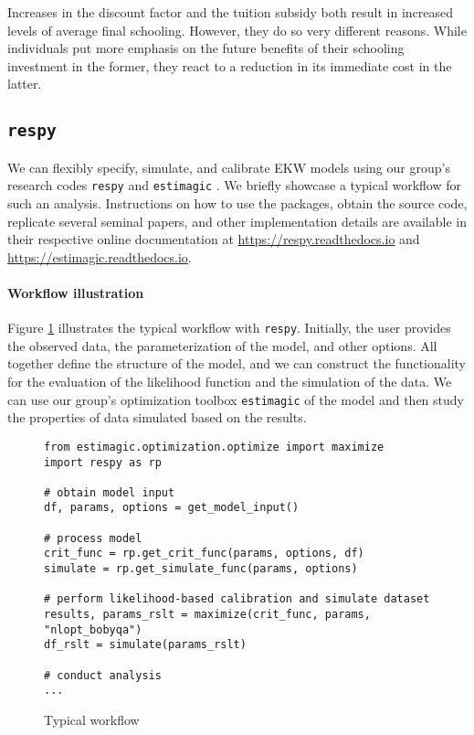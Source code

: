 \noindent Increases in the discount factor and the tuition subsidy both result in increased levels of average final schooling. However, they do so very different reasons. While individuals put more emphasis on the future benefits of their schooling investment in the former, they react to a reduction in its immediate cost in the latter.
\subsection{\texttt{respy}}
We can flexibly specify, simulate, and calibrate EKW models using our group's research codes \verb+respy+ \citep{respy-1.0} and \verb+estimagic+  \citep{Gabler.2019}. We briefly showcase a typical workflow for such an analysis. Instructions on how to use the packages, obtain the source code, replicate several seminal papers, and other implementation details are available in their respective online documentation at \url{https://respy.readthedocs.io} and \url{https://estimagic.readthedocs.io}.

\paragraph{Workflow illustration} Figure \ref{Typical workflow} illustrates the typical workflow with \verb+respy+. Initially, the user provides the observed data, the parameterization of the model, and other options. All together define the structure of the model, and we can construct the functionality for the evaluation of the likelihood function and the simulation of the data. We can use our group's optimization toolbox \verb+estimagic+ of the model and then study the properties of data simulated based on the results.

\begin{figure}[ht!]\centering
\caption{Typical workflow}\label{Typical workflow}
\begin{lstlisting}
from estimagic.optimization.optimize import maximize
import respy as rp

# obtain model input
df, params, options = get_model_input()

# process model
crit_func = rp.get_crit_func(params, options, df)
simulate = rp.get_simulate_func(params, options)

# perform likelihood-based calibration and simulate dataset
results, params_rslt = maximize(crit_func, params, "nlopt_bobyqa")
df_rslt = simulate(params_rslt)

# conduct analysis
...

\end{lstlisting}
\end{figure}\FloatBarrier

